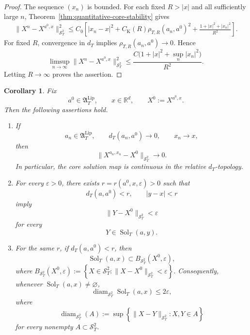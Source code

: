 \documentclass[12pt,oneside, reqno]{amsart}
\newtheorem{corollary}[theorem]{Corollary}
\numberwithin{equation}{section}
\begin{document}
	\begin{proof}
		The sequence $(x_n)$ is bounded. For each fixed $R>|x|$ and all
		sufficiently large $n$, Theorem~\ref{thm:quantitative-core-stability}
		gives
		\[
		\begin{aligned}
			\|X^n-X^{a^0,x}\|_{\mathcal S_T^2}^2
			\leq
			C_0\left[
			|x_n-x|^2
			+
			C_{\mathrm K}(R)\rho_{T,R}(a_n,a^0)^2
			+
			\frac{1+|x|^2+|x_n|^2}{R^2}
			\right].
		\end{aligned}
		\]
		For fixed $R$, convergence in $d_T$ implies
		$\rho_{T,R}(a_n,a^0)\to0$. Hence
		\[
		\limsup_{n\to\infty}
		\|X^n-X^{a^0,x}\|_{\mathcal S_T^2}^2
		\leq
		\frac{
			C\bigl(1+|x|^2+\sup_n|x_n|^2\bigr)
		}{R^2}.
		\]
		Letting $R\to\infty$ proves the assertion.
	\end{proof}
	
	\begin{corollary}
		\label{cor:core-solution-map-continuity}
		Fix
		\[
		a^0\in\mathfrak A_T^{\mathrm{Lip}},
		\qquad
		x\in\mathbb R^d,
		\qquad
		X^0:=X^{a^0,x}.
		\]
		Then the following assertions hold.
		
		\begin{enumerate}
			\item[\textnormal{(i)}]
			If
			\[
			a_n\in\mathfrak A_T^{\mathrm{Lip}},
			\qquad
			d_T(a_n,a^0)\to0,
			\qquad
			x_n\to x,
			\]
			then
			\[
			\|X^{a_n,x_n}-X^0\|_{\mathcal S_T^2}
			\longrightarrow0.
			\]
			In particular, the core solution map is continuous in the
			relative $d_T$-topology.
			
			\item[\textnormal{(ii)}]
			For every $\varepsilon>0$, there exists
			$r=r(a^0,x,\varepsilon)>0$ such that
			\[
			d_T(a,a^0)<r,
			\qquad
			|y-x|<r
			\]
			imply
			\begin{equation}
				\label{eq:stable-neighborhood-conclusion}
				\|Y-X^0\|_{\mathcal S_T^2}<\varepsilon
			\end{equation}
			for every
			\[
			Y\in\operatorname{Sol}_T(a,y).
			\]
			
			\item[\textnormal{(iii)}]
			For the same $r$, if $d_T(a,a^0)<r$, then
			\begin{equation}
				\label{eq:solution-set-contained-ball}
				\operatorname{Sol}_T(a,x)
				\subset
				B_{\mathcal S_T^2}(X^0,\varepsilon),
			\end{equation}
		where \(B_{\mathcal S_T^2}(X^0,\varepsilon):=\left\{X\in\mathcal S_T^2:\|X-X^0\|_{\mathcal S_T^2}<\varepsilon\right\}.\)	Consequently, whenever
			$\operatorname{Sol}_T(a,x)\neq\varnothing$,
			\begin{equation}
				\label{eq:nearby-solution-diameter}
				\operatorname{diam}_{\mathcal S_T^2}
				\operatorname{Sol}_T(a,x)
				\leq2\varepsilon,
			\end{equation}
			where 
			\[
			\operatorname{diam}_{\mathcal S_T^2}(A)
			:=
			\sup\left\{ \|X-Y\|_{\mathcal S_T^2} : X,Y\in A \right\}
			\]
			for every nonempty \(A\subset\mathcal S_T^2\).
		\end{enumerate}
	\end{corollary}
	
\end{document}
